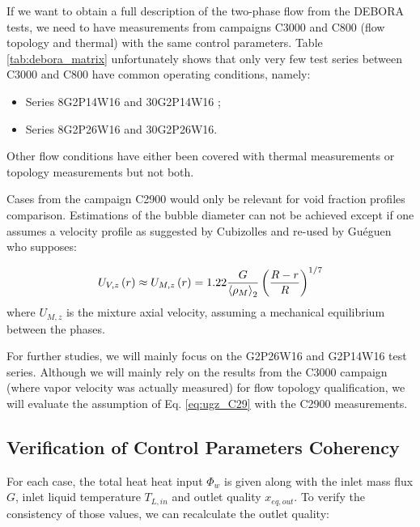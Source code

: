 If we want to obtain a full description of the two-phase flow from the DEBORA tests, we need to have measurements from campaigns C3000 and C800 (flow topology and thermal) with the same control parameters. Table \ref{tab:debora_matrix} unfortunately shows that only very few test series between C3000 and C800 have common operating conditions, namely:

\begin{itemize}
\item Series 8G2P14W16 and 30G2P14W16 ;
\item Series 8G2P26W16 and 30G2P26W16.
\end{itemize}

Other flow conditions have either been covered with thermal measurements or topology measurements but not both. 

\begin{remark*}{}
Cases from the campaign C2900 would only be relevant for void fraction profiles comparison. Estimations of the bubble diameter can not be achieved except if one assumes a velocity profile as suggested by Cubizolles \cite{cubizolles_etude_1996} and re-used by Guéguen \cite{gueguen_contribution_2013} who supposes:

\begin{equation}
U_{V,z}\left( r \right) \approx U_{M,z}\left( r \right) = 1.22 \frac{G}{\left< \rho_{M} \right>_{2}} \left(  \frac{R-r}{R} \right)^{1/7}
\label{eq:ugz_C29}
\end{equation}
where $U_{M,z}$ is the mixture axial velocity, assuming a mechanical equilibrium between the phases.

\end{remark*}


For further studies, we will mainly focus on the G2P26W16 and G2P14W16 test series. Although we will mainly rely on the results from the C3000 campaign (where vapor velocity was actually measured) for flow topology qualification, we will evaluate the assumption of Eq. \ref{eq:ugz_C29} with the C2900 measurements.


\subsection{Verification of Control Parameters Coherency}

For each case, the total heat heat input $\Phi_{w}$ is given along with the inlet mass flux $G$, inlet liquid temperature $T_{L,in}$ and outlet quality $x_{eq,out}$. To verify the consistency of those values, we can recalculate the outlet quality:


